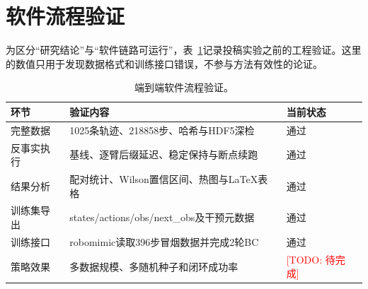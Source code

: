 \documentclass[UTF8,a4paper,10.5pt]{ctexart}
\newcommand{\todo}[1]{\textcolor{red}{[TODO: #1]}}
\begin{document}
\section{软件流程验证}
\label{app:pipeline}

为区分“研究结论”与“软件链路可运行”，表~\ref{tab:pipeline_check}记录投稿实验之前的工程验证。这里的数值只用于发现数据格式和训练接口错误，不参与方法有效性的论证。

\begin{table}[h]
\centering
\caption{端到端软件流程验证。}
\label{tab:pipeline_check}
\begin{tabular}{lll}
\toprule
环节 & 验证内容 & 当前状态 \\
\midrule
完整数据 & 1025条轨迹、218858步、哈希与HDF5深检 & 通过 \\
反事实执行 & 基线、逐臂后缀延迟、稳定保持与断点续跑 & 通过 \\
结果分析 & 配对统计、Wilson置信区间、热图与LaTeX表格 & 通过 \\
训练集导出 & states/actions/obs/next\_obs及干预元数据 & 通过 \\
训练接口 & robomimic读取396步冒烟数据并完成2轮BC & 通过 \\
策略效果 & 多数据规模、多随机种子和闭环成功率 & \todo{待完成} \\
\bottomrule
\end{tabular}
\end{table}
\end{document}
